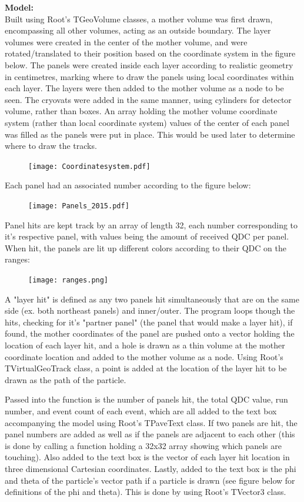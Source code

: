 \documentclass[a4paper,12pt]{article}
\begin{document}
\textbf{Model:} \\
Built using Root's TGeoVolume classes, a mother volume was first drawn, encompassing all other volumes, acting as an outside boundary. The layer volumes were created in the center of the mother volume, and were rotated/translated to their position based on the coordinate system in the figure below. The panels were created inside each layer according to realistic geometry in centimetres, marking where to draw the panels using local coordinates within each layer. The layers were then added to the mother volume as a node to be seen. The cryovats were added in the same manner, using cylinders for detector volume, rather than boxes. An array holding the mother volume coordinate system (rather than local coordinate system) values of the center of each panel was filled as the panels were put in place. This would be used later to determine where to draw the tracks.

\begin{figure}[h]
\centering
\texttt{[image: Coordinatesystem.pdf]}
\end{figure}

Each panel had an associated number according to the figure below:

\begin{figure}[h]
\centering
\texttt{[image: Panels\_2015.pdf]}
\end{figure}

Panel hits are kept track by an array of length 32, each number corresponding to it's respective panel, with values being the amount of received QDC per panel. When hit, the panels are lit up different colors according to their QDC on the ranges:

\begin{figure}[h]
\centering
\texttt{[image: ranges.png]}
\end{figure}

A "layer hit" is defined as any two panels hit simultaneously that are on the same side (ex. both northeast panels) and inner/outer. The program loops though the hits, checking for it's "partner panel" (the panel that would make a layer hit), if found, the mother coordinates of the panel are pushed onto a vector holding the location of each layer hit, and a hole is drawn as a thin volume at the mother coordinate location and added to the mother volume as a node. Using Root's TVirtualGeoTrack class, a point is added at the location of the layer hit to be drawn as the path of the particle.

Passed into the function is the number of panels hit, the total QDC value, run number, and event count of each event, which are all added to the text box accompanying the model using Root's TPaveText class. If two panels are hit, the panel numbers are added as well as if the panels are adjacent to each other (this is done by calling a function holding a 32x32 array showing which panels are touching). Also added to the text box is the vector of each layer hit location in three dimensional Cartesian coordinates. Lastly, added to the text box is the phi and theta of the particle's vector path if a particle is drawn (see figure below for definitions of the phi and theta). This is done by using Root's TVector3 class.
\end{document}
